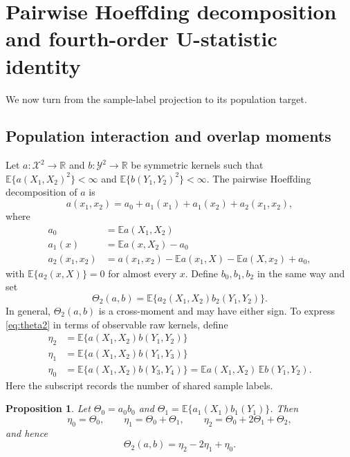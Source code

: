\documentclass[11pt]{article}
\theoremstyle{plain}
\newtheorem{proposition}[theorem]{Proposition}
\theoremstyle{definition}
\theoremstyle{remark}
\newcommand{\R}{\mathbb R}
\newcommand{\E}{\mathbb E}
\begin{document}
\section{\texorpdfstring{{Pairwise Hoeffding decomposition and fourth-order U-statistic identity}}{Pairwise Hoeffding decomposition and fourth-order U-statistic identity}}
\label{sec:pairwise-hoeffding}

We now turn from the sample-label projection to its population target.

\subsection{Population interaction and overlap moments}

Let $a:\mathcal X^2\to\R$ and $b:\mathcal Y^2\to\R$ be symmetric kernels such
that $\E\{a(X_1,X_2)^2\}<\infty$ and
$\E\{b(Y_1,Y_2)^2\}<\infty$.  The pairwise Hoeffding decomposition of $a$ is
\begin{equation}\label{eq:pair-hoeffding}
 a(x_1,x_2)=a_0+a_1(x_1)+a_1(x_2)+a_2(x_1,x_2),
\end{equation}
where
  \begin{align*}
 a_0&=\E a(X_1,X_2)\\
 a_1(x)&=\E a(x,X_2)-a_0\\
 a_2(x_1,x_2)
 &=a(x_1,x_2)-\E a(x_1,X)-\E a(X,x_2)+a_0,
\end{align*}
with $\E\{a_2(x,X)\}=0$ for almost every $x$.
Define $b_0,b_1,b_2$ in the same way and set
\begin{equation}\label{eq:theta2}
 \Theta_2(a,b)=\E\{a_2(X_1,X_2)b_2(Y_1,Y_2)\}.
\end{equation}
In general, $\Theta_2(a,b)$ is a cross-moment and may have either sign.  To
express \eqref{eq:theta2} in terms of observable raw kernels, define
  \begin{align*}
 \eta_2&=\E\{a(X_1,X_2)b(Y_1,Y_2)\}\\
 \eta_1&=\E\{a(X_1,X_2)b(Y_1,Y_3)\}\\
 \eta_0
 &=\E\{a(X_1,X_2)b(Y_3,Y_4)\}
  =\E a(X_1,X_2)\,\E b(Y_1,Y_2).
\end{align*}
Here the subscript records the number of shared sample labels.

\begin{proposition}
\label{prop:pair-overlap}
Let
$\Theta_0=a_0b_0$ and
$\Theta_1=\E\{a_1(X_1)b_1(Y_1)\}$.  Then
\[
 \eta_0=\Theta_0,\qquad
 \eta_1=\Theta_0+\Theta_1,\qquad
 \eta_2=\Theta_0+2\Theta_1+\Theta_2,
\]
and hence
\begin{equation}\label{eq:theta2-overlap}
 \Theta_2(a,b)=\eta_2-2\eta_1+\eta_0.
\end{equation}
\end{proposition}
\end{document}
